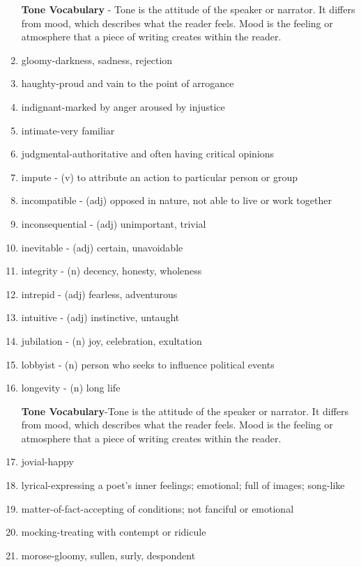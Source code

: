 \documentclass[12pt]{book}
\begin{document}
\begin{enumerate}
\bigskip
\textbf{Tone Vocabulary} - Tone is the attitude of the speaker or narrator.  It differs from mood, which describes what the reader feels. Mood is the feeling or atmosphere that a piece of writing creates within the reader.  


\item gloomy-darkness, sadness, rejection
\item haughty-proud and vain to the point of arrogance
\item indignant-marked by anger aroused by injustice
\item intimate-very familiar
\item judgmental-authoritative and often having critical opinions 

\bigskip
\item impute - (v) to attribute an action to particular person or group
\item incompatible - (adj) opposed in nature, not able to live or work together
\item inconsequential - (adj) unimportant, trivial
\item inevitable - (adj) certain, unavoidable
\item integrity - (n) decency, honesty, wholeness
\item intrepid - (adj) fearless, adventurous
\item intuitive - (adj) instinctive, untaught
\item jubilation - (n) joy, celebration, exultation
\item lobbyist - (n) person who seeks to influence political events
\item longevity - (n) long life

\bigskip
\textbf{Tone Vocabulary}-Tone is the attitude of the speaker or narrator.  It differs from mood, which describes what the reader feels.  Mood is the feeling or atmosphere that a piece of writing creates within the reader.  

\bigskip
\item jovial-happy
\item lyrical-expressing a poet's inner feelings; emotional; full of images; song-like
\item matter-of-fact-accepting of conditions; not fanciful or emotional
\item mocking-treating with contempt or ridicule
\item morose-gloomy, sullen, surly, despondent 


\end{enumerate}
\end{document}
